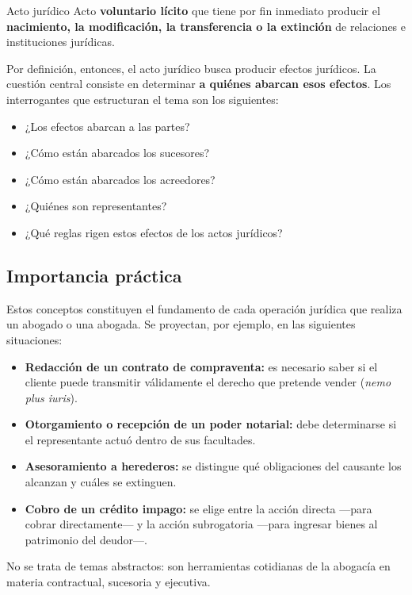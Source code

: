 \documentclass[12pt,oneside]{book}
\begin{document}
\begin{definition}{Acto jurídico}
Acto \textbf{voluntario lícito} que tiene por fin inmediato producir el \textbf{nacimiento, la modificación, la transferencia o la extinción} de relaciones e instituciones jurídicas.
\end{definition}

Por definición, entonces, el acto jurídico busca producir efectos jurídicos. La cuestión central consiste en determinar \textbf{a quiénes abarcan esos efectos}. Los interrogantes que estructuran el tema son los siguientes:

\begin{itemize}
    \item ¿Los efectos abarcan a las partes?
    \item ¿Cómo están abarcados los sucesores?
    \item ¿Cómo están abarcados los acreedores?
    \item ¿Quiénes son representantes?
    \item ¿Qué reglas rigen estos efectos de los actos jurídicos?
\end{itemize}

\subsection{Importancia práctica}

Estos conceptos constituyen el fundamento de cada operación jurídica que realiza un abogado o una abogada. Se proyectan, por ejemplo, en las siguientes situaciones:

\begin{itemize}
    \item \textbf{Redacción de un contrato de compraventa:} es necesario saber si el cliente puede transmitir válidamente el derecho que pretende vender (\textit{nemo plus iuris}).
    \item \textbf{Otorgamiento o recepción de un poder notarial:} debe determinarse si el representante actuó dentro de sus facultades.
    \item \textbf{Asesoramiento a herederos:} se distingue qué obligaciones del causante los alcanzan y cuáles se extinguen.
    \item \textbf{Cobro de un crédito impago:} se elige entre la acción directa —para cobrar directamente— y la acción subrogatoria —para ingresar bienes al patrimonio del deudor—.
\end{itemize}

No se trata de temas abstractos: son herramientas cotidianas de la abogacía en materia contractual, sucesoria y ejecutiva.
\end{document}
